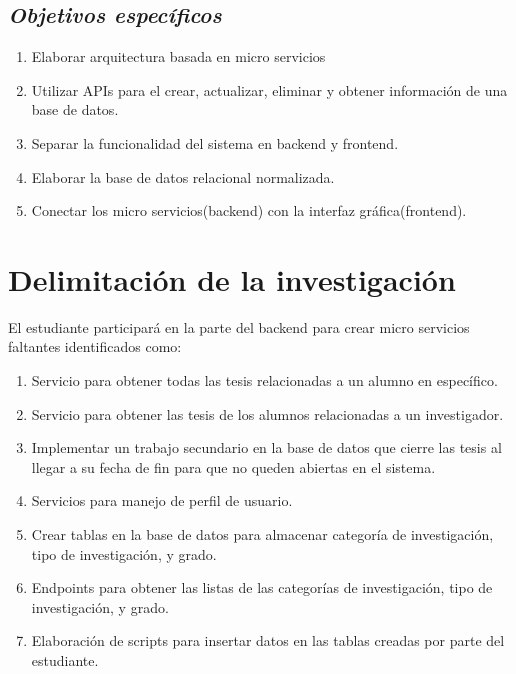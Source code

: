     \subsection{\textbf{\textit{Objetivos específicos}}} %
    \begin{enumerate}
        \item Elaborar arquitectura basada en micro servicios
        \item Utilizar APIs para el crear, actualizar, eliminar y obtener información de una base de datos.
        \item Separar la funcionalidad del sistema en backend y frontend.
        \item Elaborar la base de datos relacional normalizada.
        \item Conectar los micro servicios(backend) con la interfaz gráfica(frontend).
    \end{enumerate}

\section{Delimitación de la investigación} \label{delimitacioninvestigacion}

    El estudiante participará en la parte del backend para crear micro servicios faltantes identificados como:
    
    \begin{enumerate}
        \item Servicio para obtener todas las tesis relacionadas a un alumno en específico.
        \item Servicio para obtener las tesis de los alumnos relacionadas a un investigador.
        \item Implementar un trabajo secundario en la base de datos que cierre las tesis al llegar a su fecha de fin para que no queden abiertas en el sistema.
        \item Servicios para manejo de perfil de usuario.
        \item Crear tablas en la base de datos para almacenar categoría de investigación, tipo de investigación, y grado.
        \item Endpoints para obtener las listas de las categorías de investigación, tipo de investigación, y grado.
        \item Elaboración de scripts para insertar datos en las tablas creadas por parte del estudiante.
    \end{enumerate}

